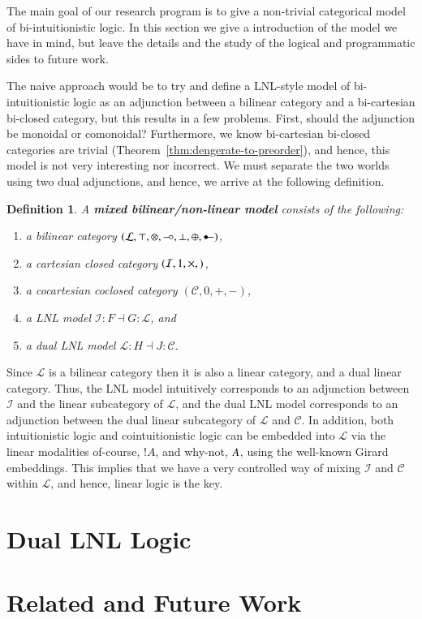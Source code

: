 \documentclass{lmcs}
\newtheorem{definition}[theorem]{Definition}
\let\to\relax
\newcommand{\to}{\rightarrow}
\let\wn\relax
\newcommand{\cat}[1]{\mathcal{#1}}
\newcommand{\limp}[0]{\multimap}
\newcommand{\colimp}[0]{\multimapdotinv}
\newcommand{\wn}[0]{\mathop{?}}
\def\limp{\mathrel{-\!\circ}}
\begin{document}
The main goal of our research program is to give a non-trivial
categorical model of bi-intuitionistic logic.  In this section we give
a introduction of the model we have in mind, but leave the details and
the study of the logical and programmatic sides to future work.

The naive approach would be to try and define a LNL-style model of
bi-intuitionistic logic as an adjunction between a bilinear category
and a bi-cartesian bi-closed category, but this results in a few
problems.  First, should the adjunction be monoidal or comonoidal?
Furthermore, we know bi-cartesian bi-closed categories are trivial
(Theorem~\ref{thm:dengerate-to-preorder}), and hence, this model is
not very interesting nor incorrect.  We must separate the two
worlds using two dual adjunctions, and hence, we arrive at the
following definition.
\begin{definition}
  \label{def:biLNL-model}
  A \textbf{mixed bilinear/non-linear model} consists of the
  following:
  \begin{enumerate}[label=\roman*.]
  \item a bilinear category $(\cat{L},
    \top,\otimes,\limp,\perp,\oplus,\colimp)$,
  \item a cartesian closed category $(\cat{I},1,\times,\to)$,
  \item a cocartesian coclosed category $(\cat{C},0,+,-)$, 
  \item a LNL model $\cat{I} : F \dashv G : \cat{L}$, and
  \item a dual LNL model $\cat{L} : H \dashv J : \cat{C}$.
  \end{enumerate}
\end{definition}
Since $\cat{L}$ is a bilinear category then it is also a linear
category, and a dual linear category.  Thus, the LNL model intuitively
corresponds to an adjunction between $\cat{I}$ and the linear
subcategory of $\cat{L}$, and the dual LNL model corresponds to an
adjunction between the dual linear subcategory of $\cat{L}$ and
$\cat{C}$.  In addition, both intuitionistic logic and
cointuitionistic logic can be embedded into $\cat{L}$ via the linear
modalities of-course, $!A$, and why-not, $\wn A$, using the well-known
Girard embeddings.  This implies that we have a very controlled way of
mixing $\cat{I}$ and $\cat{C}$ within $\cat{L}$, and hence, linear
logic is the key.

\section{Dual LNL Logic}
\label{sec:dual_lnl_logic}



\section{Related and Future Work}
\label{sec:related_work}


 

\appendix

\end{document}

